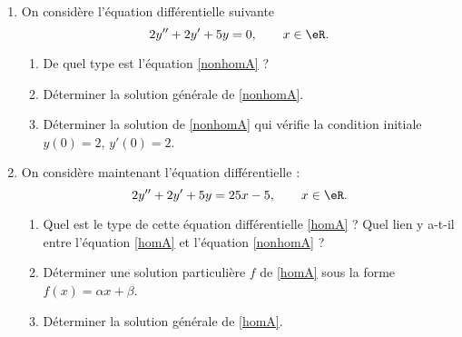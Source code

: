 
\begin{exercice}\label{exoanalyseCTU-0017}


\begin{enumerate}
\item  On considère l'équation différentielle suivante
  \begin{equation}\label{nonhomA}
    2y'' + 2 y' +5y = 0, \qquad x\in\eR.
  \end{equation}
  \begin{enumerate}
  \item De quel type est l'équation \eqref{nonhomA} ?
  \item Déterminer la solution générale de \eqref{nonhomA}.
  \item Déterminer la solution de \eqref{nonhomA} qui vérifie la condition initiale $y(0) = 2$, $y'(0) = 2$.
  \end{enumerate}
 \item  On considère maintenant l'équation différentielle :
  \begin{equation}\label{homA}
    2y'' + 2 y' +5y = 25x-5, \qquad x\in\eR.
  \end{equation}
  \begin{enumerate}
  \item Quel est le type de cette équation différentielle \eqref{homA} ? Quel lien y a-t-il entre l'équation \eqref{homA} et  l'équation \eqref{nonhomA} ? 
  \item Déterminer une solution particulière $f$ de \eqref{homA} sous la forme $f(x) = \alpha x+\beta $.
  \item  Déterminer la solution générale de \eqref{homA}. 
  \end{enumerate}
\end{enumerate}


\end{exercice}
